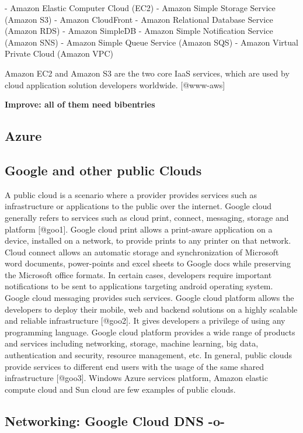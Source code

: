     -  Amazon Elastic Computer Cloud (EC2)
     -  Amazon Simple Storage Service (Amazon S3)
     -  Amazon CloudFront
     -  Amazon Relational Database Service (Amazon RDS)
     -  Amazon SimpleDB
     -  Amazon Simple Notification Service (Amazon SNS)
     -  Amazon Simple Queue Service (Amazon SQS)
     -  Amazon Virtual Private Cloud (Amazon VPC)

Amazon EC2 and Amazon S3 are the two core IaaS services, which are
used by cloud application solution developers
worldwide. [@www-aws]

     {\bf Improve: all of them need bibentries}
     
\subsection{Azure}
\subsection{Google and other public Clouds}

A public cloud is a scenario where a provider provides services such
as infrastructure or applications to the public over the
internet. Google cloud generally refers to services such as cloud
print, connect, messaging, storage and platform [@goo1]. Google
cloud print allows a print-aware application on a device, installed on
a network, to provide prints to any printer on that network. Cloud
connect allows an automatic storage and synchronization of Microsoft
word documents, power-points and excel sheets to Google docs while
preserving the Microsoft office formats. In certain cases, developers
require important notifications to be sent to applications targeting
android operating system. Google cloud messaging provides such
services. Google cloud platform allows the developers to deploy their
mobile, web and backend solutions on a highly scalable and reliable
infrastructure [@goo2]. It gives developers a privilege of using
any programming language. Google cloud platform provides a wide range
of products and services including networking, storage, machine
learning, big data, authentication and security, resource management,
etc. In general, public clouds provide services to different end users
with the usage of the same shared infrastructure [@goo3]. Windows
Azure services platform, Amazon elastic compute cloud and Sun cloud
are few examples of public clouds.
     
\subsection{Networking: Google Cloud DNS -o-}

